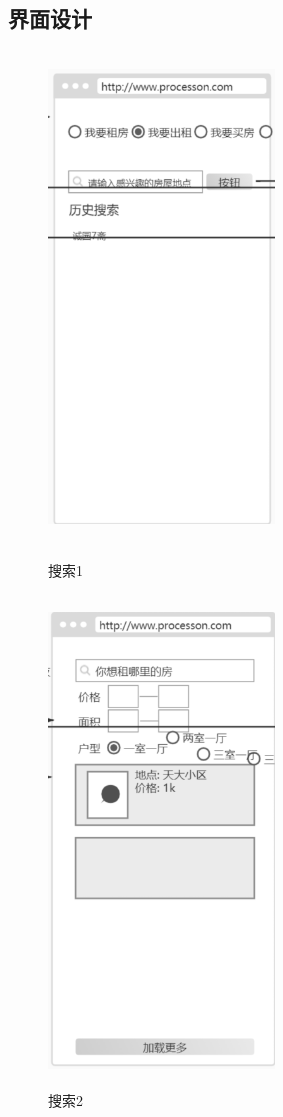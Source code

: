 \subsection{界面设计}
\begin{figure}[htbp]
    \centering
    \begin{minipage}[t]{0.48\textwidth}
    \centering
    \includegraphics[width=6cm,height=13cm]{design/image/sousuo.png} 
    \caption{搜索1}
    \end{minipage}
    \begin{minipage}[t]{0.48\textwidth}
    \centering
    \includegraphics[width=6cm,height=13cm]{design/image/ui3.png}
    \caption{搜索2}
    \end{minipage}
    \end{figure}
\newpage
